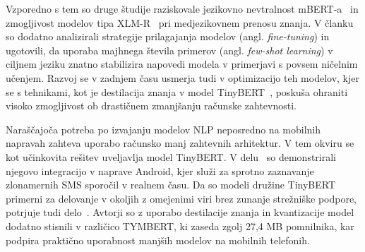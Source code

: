 \documentclass[sigconf,nonacm]{acmart}
\begin{document}
Vzporedno s tem so druge študije raziskovale jezikovno nevtralnost mBERT-a~\cite{pires2019} in zmogljivost modelov tipa XLM-R~\cite{conneau2020} 
pri medjezikovnem prenosu znanja. V članku~\cite{zhao2021closer} so dodatno analizirali strategije prilagajanja modelov (angl. \emph{fine-tuning}) 
in ugotovili, da uporaba majhnega števila primerov (angl. \emph{few-shot learning}) v ciljnem jeziku znatno stabilizira napovedi modela v primerjavi 
s povsem ničelnim učenjem. Razvoj se v zadnjem času usmerja tudi v optimizacijo teh modelov, kjer se s tehnikami, kot je destilacija znanja v model 
TinyBERT~\cite{jiao-etal-2020-tinybert}, poskuša ohraniti visoko zmogljivost ob drastičnem zmanjšanju računske zahtevnosti.

Naraščajoča potreba po izvajanju modelov NLP neposredno na mobilnih napravah zahteva uporabo računsko manj zahtevnih arhitektur. V tem okviru se kot učinkovita rešitev uveljavlja model TinyBERT. V delu~\cite{10936701} so demonstrirali njegovo integracijo v naprave Android, kjer služi za sprotno zaznavanje zlonamernih SMS sporočil v realnem času. Da so modeli družine TinyBERT primerni za delovanje v okoljih z omejenimi viri brez zunanje strežniške podpore, potrjuje tudi delo~\cite{11160230}. Avtorji so z uporabo destilacije znanja in kvantizacije model dodatno stisnili v različico TYMBERT, ki zaseda zgolj 27,4 MB pomnilnika, kar podpira praktično uporabnost manjših modelov na mobilnih telefonih.



\end{document}
